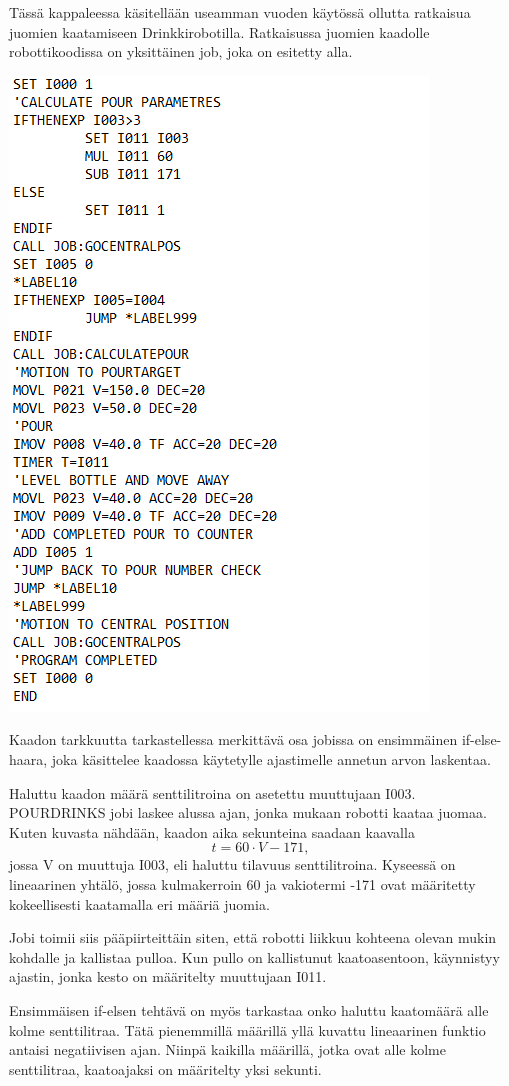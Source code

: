 Tässä kappaleessa käsitellään useamman vuoden käytössä ollutta ratkaisua juomien kaatamiseen Drinkkirobotilla. Ratkaisussa juomien kaadolle robottikoodissa on yksittäinen job, joka on esitetty alla.

\begin{center}
\includegraphics[scale=0.8]{img/POURDRINKS.png}
\end{center}

Kaadon tarkkuutta tarkastellessa merkittävä osa jobissa on ensimmäinen if-else-haara, joka käsittelee kaadossa käytetylle ajastimelle annetun arvon laskentaa.

Haluttu kaadon määrä senttilitroina on asetettu muuttujaan I003. POURDRINKS jobi laskee alussa ajan, jonka mukaan robotti kaataa juomaa. Kuten kuvasta nähdään, kaadon aika sekunteina saadaan kaavalla
\[t = 60 \cdot V - 171, \]
jossa V on muuttuja I003, eli haluttu tilavuus senttilitroina. Kyseessä on lineaarinen yhtälö, jossa kulmakerroin 60 ja vakiotermi -171 ovat määritetty kokeellisesti kaatamalla eri määriä juomia.

Jobi toimii siis pääpiirteittäin siten, että robotti liikkuu kohteena olevan mukin kohdalle ja kallistaa pulloa. Kun pullo on kallistunut kaatoasentoon, käynnistyy ajastin, jonka kesto on määritelty muuttujaan I011.

Ensimmäisen if-elsen tehtävä on myös tarkastaa onko haluttu kaatomäärä alle kolme senttilitraa. Tätä pienemmillä määrillä yllä kuvattu lineaarinen funktio antaisi negatiivisen ajan. Niinpä kaikilla määrillä, jotka ovat alle kolme senttilitraa, kaatoajaksi on määritelty yksi sekunti.
